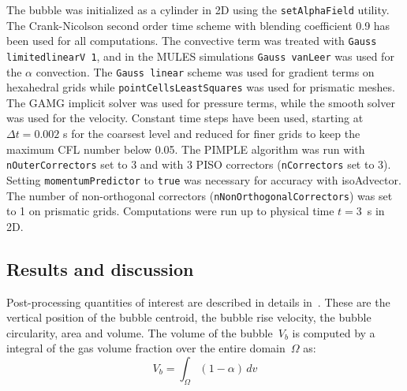 \documentclass[review]{elsarticle}
\begin{document}
The bubble was initialized as a cylinder in 2D using the \verb+setAlphaField+ utility. The Crank-Nicolson second order time scheme with blending coefficient 0.9 has been used for all computations. The convective term was treated with \verb+Gauss limitedlinearV 1+, and in the MULES simulations \verb+Gauss vanLeer+ was used for the $\alpha$ convection. The \verb+Gauss linear+ scheme was used for gradient terms on hexahedral grids while \verb+pointCellsLeastSquares+ was used for prismatic meshes. The GAMG implicit solver was used for pressure terms, while the smooth solver was used for the velocity. Constant time steps have been used, starting at $\Delta t=0.002$ s for the coarsest level and reduced for finer grids to keep the maximum CFL number below 0.05. The PIMPLE algorithm was run with \verb+nOuterCorrectors+ set to 3 and with 3 PISO correctors (\verb+nCorrectors+ set to 3). Setting \verb+momentumPredictor+ to \verb+true+ was necessary for accuracy with isoAdvector. The number of non-orthogonal correctors (\verb+nNonOrthogonalCorrectors+) was set to 1 on prismatic grids. Computations were run up to physical time $t=3$~s in 2D. 

\subsection{Results and discussion}\label{sec_hysingresults}
Post-processing quantities of interest are described in details in~\cite{Hysing2009,Adelsberger2014}. These are the vertical position of the bubble centroid, the bubble rise velocity, the bubble circularity, area and volume. The volume of the bubble~$V_b$ is computed by a integral of the gas volume fraction over the entire domain~$\Omega$ as: 
\begin{equation}
  V_b = \int_{\Omega} (1-\alpha)\,dv
\end{equation}
\end{document}
